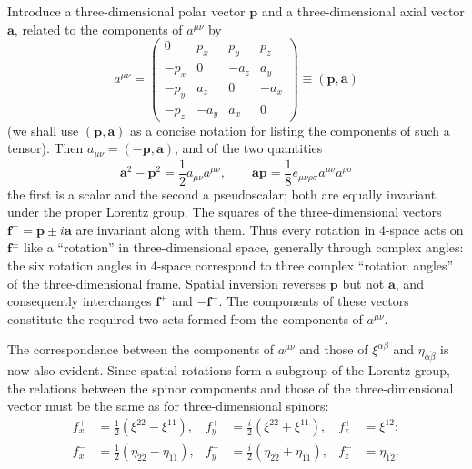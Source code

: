 Introduce a three-dimensional polar vector $\mathbf p$ and a three-dimensional axial vector $\mathbf a$, related to the components of $a^{\mu\nu}$ by
\begin{equation}
a^{\mu\nu}=
\begin{pmatrix}
0 & p_x & p_y & p_z\\
-p_x & 0 & -a_z & a_y\\
-p_y & a_z & 0 & -a_x\\
-p_z & -a_y & a_x & 0
\end{pmatrix}
\equiv(\mathbf p,\mathbf a)
\tag{19.15}
\end{equation}
(we shall use $(\mathbf p,\mathbf a)$ as a concise notation for listing the components of such a tensor). Then $a_{\mu\nu}=(-\mathbf p,\mathbf a)$, and of the two quantities
\[
\mathbf a^2-\mathbf p^2=\frac12a_{\mu\nu}a^{\mu\nu},
\qquad
\mathbf a\mathbf p=\frac18e_{\mu\nu\rho\sigma}a^{\mu\nu}a^{\rho\sigma}
\]
the first is a scalar and the second a pseudoscalar; both are equally invariant under the proper Lorentz group. The squares of the three-dimensional vectors $\mathbf f^\pm=\mathbf p\pm i\mathbf a$ are invariant along with them. Thus every rotation in 4-space acts on $\mathbf f^\pm$ like a ``rotation'' in three-dimensional space, generally through complex angles: the six rotation angles in 4-space correspond to three complex ``rotation angles'' of the three-dimensional frame. Spatial inversion reverses $\mathbf p$ but not $\mathbf a$, and consequently interchanges $\mathbf f^+$ and $-\mathbf f^-$. The components of these vectors constitute the required two sets formed from the components of $a^{\mu\nu}$.

The correspondence between the components of $a^{\mu\nu}$ and those of $\xi^{\alpha\beta}$ and $\eta_{\dot\alpha\dot\beta}$ is now also evident. Since spatial rotations form a subgroup of the Lorentz group, the relations between the spinor components and those of the three-dimensional vector must be the same as for three-dimensional spinors:
\begin{equation}
\begin{aligned}
f_x^+&=\frac12(\xi^{22}-\xi^{11}),&
f_y^+&=\frac{i}{2}(\xi^{22}+\xi^{11}),&
f_z^+&=\xi^{12};\\
f_x^-&=\frac12(\eta_{\dot2\dot2}-\eta_{\dot1\dot1}),&
f_y^-&=\frac{i}{2}(\eta_{\dot2\dot2}+\eta_{\dot1\dot1}),&
f_z^-&=\eta_{\dot1\dot2}.
\end{aligned}
\tag{19.16}
\end{equation}

